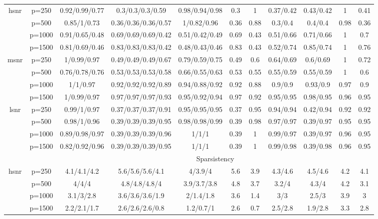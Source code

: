 \begin{table}[ht]
{\begin{tabular}{|c|c|ccccccccc|}
\midrule\multirow{4}[2]{*}{hsnr} & p=250 & 0.92/0.99/0.77 & 0.3/0.3/0.3/0.59 & 0.98/0.94/0.98 & 0.3 & 1 & 0.37/0.42 & 0.43/0.42 & 1 & 0.41 \\ 
   & p=500 & 0.85/1/0.73 & 0.36/0.36/0.36/0.57 & 1/0.82/0.96 & 0.36 & 0.88 & 0.3/0.4 & 0.4/0.4 & 0.98 & 0.36 \\ 
   & p=1000 & 0.91/0.65/0.48 & 0.69/0.69/0.69/0.42 & 0.51/0.42/0.49 & 0.69 & 0.43 & 0.51/0.66 & 0.71/0.66 & 1 & 0.7 \\ 
   & p=1500 & 0.81/0.69/0.46 & 0.83/0.83/0.83/0.42 & 0.48/0.43/0.46 & 0.83 & 0.43 & 0.52/0.74 & 0.85/0.74 & 1 & 0.76 \\ 
  \midrule\multirow{4}[2]{*}{msnr} & p=250 & 1/0.99/0.97 & 0.49/0.49/0.49/0.67 & 0.79/0.59/0.75 & 0.49 & 0.6 & 0.64/0.69 & 0.6/0.69 & 1 & 0.72 \\ 
   & p=500 & 0.76/0.78/0.76 & 0.53/0.53/0.53/0.58 & 0.66/0.55/0.63 & 0.53 & 0.55 & 0.55/0.59 & 0.55/0.59 & 1 & 0.6 \\ 
   & p=1000 & 1/1/0.97 & 0.92/0.92/0.92/0.89 & 0.94/0.88/0.92 & 0.92 & 0.88 & 0.9/0.9 & 0.93/0.9 & 0.97 & 0.9 \\ 
   & p=1500 & 1/0.99/0.97 & 0.97/0.97/0.97/0.93 & 0.95/0.92/0.94 & 0.97 & 0.92 & 0.95/0.95 & 0.98/0.95 & 0.96 & 0.95 \\ 
  \midrule\multirow{4}[2]{*}{lsnr} & p=250 & 0.99/1/0.97 & 0.37/0.37/0.37/0.91 & 0.95/0.95/0.95 & 0.37 & 0.95 & 0.94/0.94 & 0.42/0.94 & 0.92 & 0.92 \\ 
   & p=500 & 0.98/1/0.96 & 0.39/0.39/0.39/0.95 & 0.98/0.98/0.99 & 0.39 & 0.98 & 0.97/0.97 & 0.39/0.97 & 0.95 & 0.95 \\ 
   & p=1000 & 0.89/0.98/0.97 & 0.39/0.39/0.39/0.96 & 1/1/1 & 0.39 & 1 & 0.99/0.97 & 0.39/0.97 & 0.96 & 0.95 \\ 
   & p=1500 & 0.82/0.92/0.96 & 0.39/0.39/0.39/0.95 & 1/1/1 & 0.39 & 1 & 0.99/0.98 & 0.39/0.98 & 0.96 & 0.95 \\ 
   \midrule 
 \multicolumn{1}{|c}{} &       & \multicolumn{9}{c|}{Sparsistency} \\
\midrule\multirow{4}[2]{*}{hsnr} & p=250 & 4.1/4.1/4.2 & 5.6/5.6/5.6/4.1 & 4/3.9/4 & 5.6 & 3.9 & 4.3/4.6 & 4.5/4.6 & 4.2 & 4.1 \\ 
   & p=500 & 4/4/4 & 4.8/4.8/4.8/4 & 3.9/3.7/3.8 & 4.8 & 3.7 & 3.2/4 & 4.3/4 & 4.2 & 3.1 \\ 
   & p=1000 & 3.1/3/2.8 & 3.6/3.6/3.6/1.9 & 2/1.4/1.8 & 3.6 & 1.4 & 3/3 & 2.5/3 & 3.9 & 3 \\ 
   & p=1500 & 2.2/2.1/1.7 & 2.6/2.6/2.6/0.8 & 1.2/0.7/1 & 2.6 & 0.7 & 2.5/2.8 & 1.9/2.8 & 3.3 & 2.8 \\ 

\end{tabular}}
\end{table}
